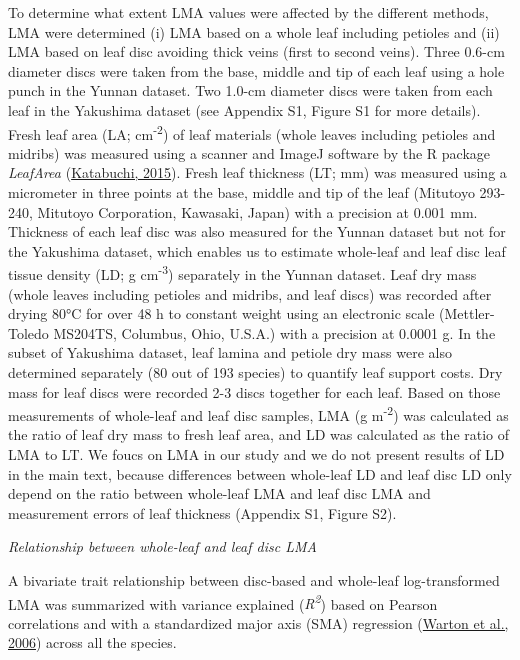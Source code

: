 \documentclass[
  12pt,
  a4paper,
,tablecaptionabove
]{scrartcl}
\begin{document}
To determine what extent LMA values were affected by the different methods, LMA were determined (i) LMA based on a whole leaf including petioles and (ii) LMA based on leaf disc avoiding thick veins (first to second veins).
Three 0.6-cm diameter discs were taken from the base, middle and tip of each leaf using a hole punch in the Yunnan dataset.
Two 1.0-cm diameter discs were taken from each leaf in the Yakushima dataset (see Appendix S1, Figure S1 for more details).
Fresh leaf area (LA; cm\textsuperscript{-2}) of leaf materials (whole leaves including petioles and midribs) was measured using a scanner and ImageJ software by the R package \emph{LeafArea} (\protect\hyperlink{ref-Katabuchi2015}{Katabuchi, 2015}).
Fresh leaf thickness (LT; mm) was measured using a micrometer in three points at the base, middle and tip of the leaf (Mitutoyo 293-240, Mitutoyo Corporation, Kawasaki, Japan) with a precision at 0.001 mm.
Thickness of each leaf disc was also measured for the Yunnan dataset but not for the Yakushima dataset, which enables us to estimate whole-leaf and leaf disc leaf tissue density (LD; g cm\textsuperscript{-3}) separately in the Yunnan dataset.
Leaf dry mass (whole leaves including petioles and midribs, and leaf discs) was recorded after drying 80°C for over 48 h to constant weight using an electronic scale (Mettler-Toledo MS204TS, Columbus, Ohio, U.S.A.) with a precision at 0.0001 g.
In the subset of Yakushima dataset, leaf lamina and petiole dry mass were also determined separately (80 out of 193 species) to quantify leaf support costs.
Dry mass for leaf discs were recorded 2-3 discs together for each leaf.
Based on those measurements of whole-leaf and leaf disc samples, LMA (g m\textsuperscript{-2}) was calculated as the ratio of leaf dry mass to fresh leaf area, and LD was calculated as the ratio of LMA to LT.
We foucs on LMA in our study and we do not present results of LD in the main text, because differences between whole-leaf LD and leaf disc LD only depend on the ratio between whole-leaf LMA and leaf disc LMA and measurement errors of leaf thickness (Appendix S1, Figure S2).

\emph{Relationship between whole-leaf and leaf disc LMA}

A bivariate trait relationship between disc-based and whole-leaf log-transformed LMA was summarized with variance explained (\emph{R\textsuperscript{2}}) based on Pearson correlations and with a standardized major axis (SMA) regression (\protect\hyperlink{ref-Warton2006}{Warton et al., 2006}) across all the species.
\end{document}
